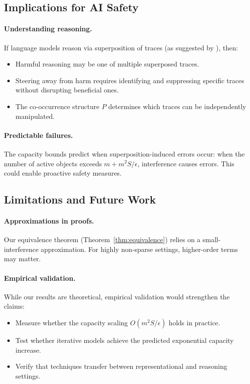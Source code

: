 \subsection{Implications for AI Safety}

\paragraph{Understanding reasoning.} If language models reason via superposition of traces (as suggested by \citet{zhu2025reasoning}), then:
\begin{itemize}
    \item Harmful reasoning may be one of multiple superposed traces.
    \item Steering away from harm requires identifying and suppressing specific traces without disrupting beneficial ones.
    \item The co-occurrence structure $P$ determines which traces can be independently manipulated.
\end{itemize}

\paragraph{Predictable failures.} The capacity bounds predict when superposition-induced errors occur: when the number of active objects exceeds $m + m^2 S / \epsilon$, interference causes errors. This could enable proactive safety measures.

\subsection{Limitations and Future Work}

\paragraph{Approximations in proofs.} Our equivalence theorem (Theorem~\ref{thm:equivalence}) relies on a small-interference approximation. For highly non-sparse settings, higher-order terms may matter.

\paragraph{Empirical validation.} While our results are theoretical, empirical validation would strengthen the claims:
\begin{itemize}
    \item Measure whether the capacity scaling $O(m^2 S / \epsilon)$ holds in practice.
    \item Test whether iterative models achieve the predicted exponential capacity increase.
    \item Verify that techniques transfer between representational and reasoning settings.
\end{itemize}

